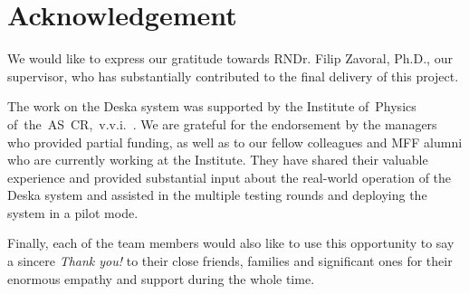 \documentclass[deska]{subfiles}
\begin{document}
\cleardoublepage
{}
{}
\chapter*{Acknowledgement}
\label{sec:acknowledgement}

We would like to express our gratitude towards RNDr. Filip Zavoral, Ph.D., our supervisor, who has substantially
contributed to the final delivery of this project.

The work on the Deska system was supported by the Institute of~Physics of~the~AS~CR,~v.v.i.~\cite{fzu}.  We are grateful
for the endorsement by the managers who provided partial funding, as well as to our fellow colleagues and MFF alumni who
are currently working at the Institute.  They have shared their valuable experience and provided substantial input about
the real-world operation of the Deska system and assisted in the multiple testing rounds and deploying the system in a
pilot mode.

Finally, each of the team members would also like to use this opportunity to say a sincere {\em Thank you!} to their
close friends, families and significant ones for their enormous empathy and support during the whole time.
\end{document}
